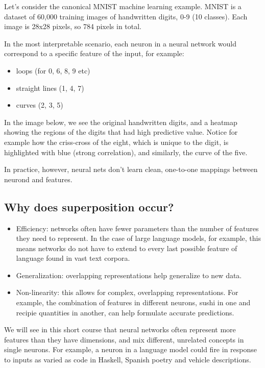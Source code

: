 \documentclass[
  letterpaper,
  DIV=11,
  numbers=noendperiod]{scrreprt}
\providecommand{\tightlist}{%
  \setlength{\itemsep}{0pt}\setlength{\parskip}{0pt}}\usepackage{longtable,booktabs,array}
\begin{document}
Let's consider the canonical MNIST machine learning example. MNIST is a
dataset of 60,000 training images of handwritten digits, 0-9 (10
classes). Each image is 28x28 pixels, so 784 pixels in total.

In the most interpretable scenario, each neuron in a neural network
would correspond to a specific feature of the input, for example:

\begin{itemize}
\tightlist
\item
  loops (for 0, 6, 8, 9 etc)
\item
  straight lines (1, 4, 7)
\item
  curves (2, 3, 5)
\end{itemize}

In the image below, we see the original handwritten digits, and a
heatmap showing the regions of the digits that had high predictive
value. Notice for example how the criss-cross of the eight, which is
unique to the digit, is highlighted with blue (strong correlation), and
similarly, the curve of the five.

In practice, however, neural nets don't learn clean, one-to-one mappings
between neurond and features.

\subsection{Why does superposition
occur?}\label{why-does-superposition-occur}

\begin{itemize}
\item
  Efficiency: networks often have fewer parameters than the number of
  features they need to represent. In the case of large language models,
  for example, this means networks do not have to extend to every last
  possible feature of language found in vast text corpora.
\item
  Generalization: overlapping representations help generalize to new
  data.
\item
  Non-linearity: this allows for complex, overlapping representations.
  For example, the combination of features in different neurons, sushi
  in one and recipie quantities in another, can help formulate accurate
  predictions.
\end{itemize}

We will see in this short course that neural networks often represent
more features than they have dimensions, and mix different, unrelated
concepts in single neurons. For example, a neuron in a language model
could fire in response to inputs as varied as code in Haskell, Spanish
poetry and vehicle descriptions.
\end{document}
